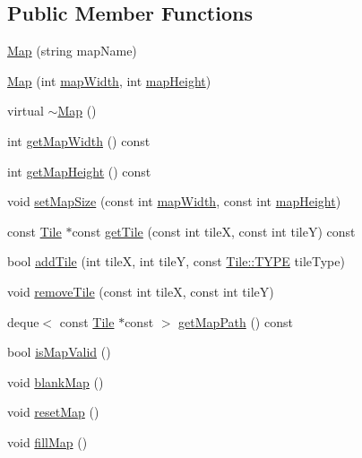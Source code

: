 \subsection*{Public Member Functions}
\begin{DoxyCompactItemize}
\item 
\hyperlink{class_map_a11a8645ff656f9efeb5a6758b36d1264}{Map} (string map\+Name)
\item 
\hyperlink{class_map_af3e300404b4bdacb2761300cb3cc1eda}{Map} (int \hyperlink{class_map_a9660b072c56d69d3639e364835f0188d}{map\+Width}, int \hyperlink{class_map_a4674385319ae4f0c6672f4fe69f97b5c}{map\+Height})
\item 
virtual \hyperlink{class_map_aa403fbe09394ccf39747588f5168e3b2}{$\sim$\+Map} ()
\item 
int \hyperlink{class_map_a59b1f7d135d6a62ba210585951f4f419}{get\+Map\+Width} () const 
\item 
int \hyperlink{class_map_a076782bd4ca4a53eb57a894b336f5090}{get\+Map\+Height} () const 
\item 
void \hyperlink{class_map_a3079c08faaa2fd3984bed5471488a790}{set\+Map\+Size} (const int \hyperlink{class_map_a9660b072c56d69d3639e364835f0188d}{map\+Width}, const int \hyperlink{class_map_a4674385319ae4f0c6672f4fe69f97b5c}{map\+Height})
\item 
const \hyperlink{class_tile}{Tile} $\ast$const \hyperlink{class_map_aa8e57f0e6d665def93ad7b33413e98a7}{get\+Tile} (const int tile\+X, const int tile\+Y) const 
\item 
bool \hyperlink{class_map_abc4fae321b0a5e1ed4954b7a539686de}{add\+Tile} (int tile\+X, int tile\+Y, const \hyperlink{class_tile_acb53d82f9dacff45a98acc63276928eb}{Tile\+::\+T\+Y\+P\+E} tile\+Type)
\item 
void \hyperlink{class_map_a69be425dd99011951d8c4f08b598703b}{remove\+Tile} (const int tile\+X, const int tile\+Y)
\item 
deque$<$ const \hyperlink{class_tile}{Tile} $\ast$const  $>$ \hyperlink{class_map_a0fb29a18390a3008cab71f602aa4209b}{get\+Map\+Path} () const 
\item 
bool \hyperlink{class_map_a915168b8ce4bb812c591e34d17163a75}{is\+Map\+Valid} ()
\item 
void \hyperlink{class_map_afa8798ebce5315b393755d8656fa6038}{blank\+Map} ()
\item 
void \hyperlink{class_map_a79a7d2715d8face71c5f16be9e14ac0a}{reset\+Map} ()
\item 
void \hyperlink{class_map_a9e82077ad5054dbbe6434cf89738dbf5}{fill\+Map} ()

\end{DoxyCompactItemize}
